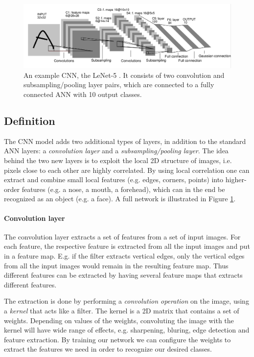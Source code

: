 \begin{figure}[h!]
  \centering
      \includegraphics[width=1.2\textwidth]{Figures/Background/convnet}
  \caption[The LeNet-5]{An example CNN, the LeNet-5 \cite{LeCun1998}. It consists of two convolution and subsampling/pooling layer pairs, which are connected to a fully connected ANN with 10 output classes.}
  \label{fig_cnn}
\end{figure}

\subsection{Definition} \label{sec_cnn_def}

The CNN model adds two additional types of layers, in addition to the standard ANN layers: a \textit{convolution layer} and a \textit{subsampling/pooling layer}. The idea behind the two new layers is to exploit the local 2D structure of images, i.e. pixels close to each other are highly correlated. By using local correlation one can extract and combine small local features (e.g. edges, corners, points) into higher-order features (e.g. a nose, a mouth, a forehead), which can in the end be recognized as an object (e.g. a face).  A full network is illustrated in Figure \ref{fig_cnn}.


\paragraph{Convolution layer}  \hfill \break
The convolution layer extracts a set of features from a set of input images. For each feature, the respective feature is extracted from all the input images and put in a feature map. E.g. if the filter extracts vertical edges, only the vertical edges from all the input images would remain in the resulting feature map. Thus different features can be extracted by having several feature maps that extracts different features. 

The extraction is done by performing a \textit{convolution operation} on the image, using a \textit{kernel} that acts like a filter. The kernel is a 2D matrix that contains a set of weights. Depending on values of the weights, convoluting the image with the kernel will have wide range of effects, e.g. sharpening, bluring, edge detection  and feature extraction. By training our network we can configure the weights to extract the features we need in order to recognize our desired classes. 

